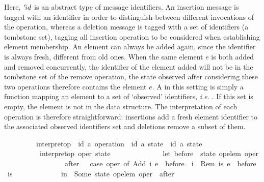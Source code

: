 \noindent Here, ${\emph{$\mskip2mu{'}\mskip-2mu$}}id$ is an abstract type of message identifiers.
An insertion message is tagged with an identifier in order to distinguish
between different invocations of the operation, whereas a deletion message is
tagged with a set of identifiers (a tombstone set), tagging all insertion
operation to be considered when establishing element membership.  An element
can always be added again, since the identifier is always fresh, different from
old ones. When the same element $e$ is both added and removed concurrently, the
identifier of the element added will not be in the tombstone set of the remove
operation, the state observed after considering these two operations therefore
contains the element $e$.  A
 in this setting is simply a
function mapping an element to a set of `observed' identifiers, \emph{i.e.}
. If this set is empty, the
element is not in the data structure.  The interpretation of each operation is
therefore straightforward: insertions add a fresh element identifier to the
associated observed identifiers set and deletions remove a subset of them.

\vspace{0.375em}
\begin{isabellebody}
\ \ \ \ \ \ \ \ \ interpret{\isacharunderscore}op\ {\isacharcolon}{\isacharcolon}\ {\isachardoublequoteopen}{\isacharparenleft}{\isacharprime}id{\isacharcomma}\ {\isacharprime}a{\isacharparenright}\ operation\ {\isasymRightarrow}\ {\isacharparenleft}{\isacharprime}id{\isacharcomma}\ {\isacharprime}a{\isacharparenright}\ state\ {\isasymrightharpoonup}\ {\isacharparenleft}{\isacharprime}id{\isacharcomma}\ {\isacharprime}a{\isacharparenright}\ state{\isachardoublequoteclose}\ {\isacharparenleft}{\isachardoublequoteopen}{\isasymlangle}{\isacharunderscore}{\isasymrangle}{\isachardoublequoteclose}\ {\isacharbrackleft}{}{\isacharbrackright}\ {}{}{}{}{\isacharparenright}\ \isanewline
\ \ \ \ \ \ \ \ \ \ {\isachardoublequoteopen}interpret{\isacharunderscore}op\ oper\ state\ {\isasymequiv}\isanewline
\ \ \ \ \ \ \ \ \ \ \ \ \ let\ before\ {\isacharequal}\ state\ {\isacharparenleft}op{\isacharunderscore}elem\ oper{\isacharparenright}{\isacharsemicolon}\isanewline
\ \ \ \ \ \ \ \ \ \ \ \ \ \ \ \ \ after\ \ {\isacharequal}\ case\ oper\ of\ Add\ i\ e\ {\isasymRightarrow}\ before\ {\isasymunion}\ {\isacharbraceleft}i{\isacharbraceright}\ {\isacharbar}\ Rem\ is\ e\ {\isasymRightarrow}\ before\ {\isacharminus}\ is\isanewline
\ \ \ \ \ \ \ \ \ \ \ \ \ in\ \ Some\ {\isacharparenleft}state\ {\isacharparenleft}{\isacharparenleft}op{\isacharunderscore}elem\ oper{\isacharparenright}\ {\isacharcolon}{\isacharequal}\ after{\isacharparenright}{\isacharparenright}{\isachardoublequoteclose}
\end{isabellebody}
\vspace{0.375em}

